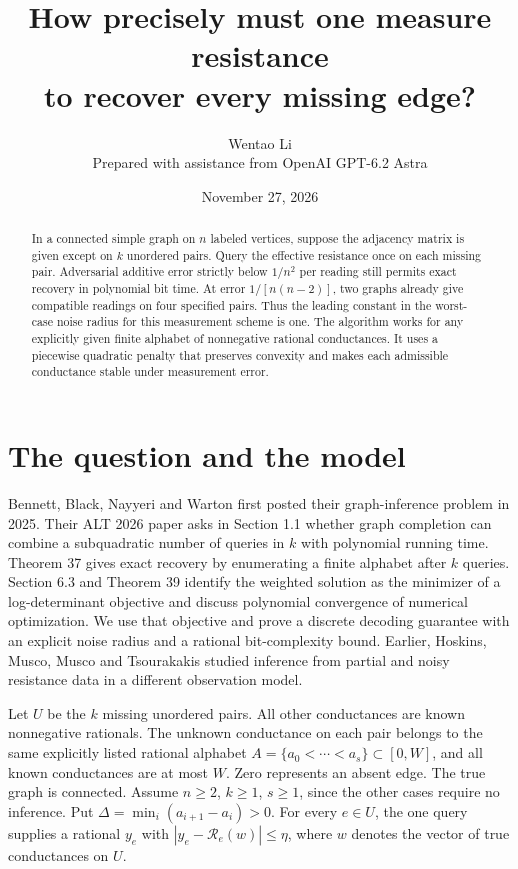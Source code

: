 \documentclass[11pt]{article}
\title{How precisely must one measure resistance\\ to recover every missing edge?}
\author{Wentao Li\\\small Prepared with assistance from OpenAI GPT-6.2 Astra}
\date{November 27, 2026}
\newcommand{\res}{\mathcal R}
\begin{document}
\maketitle
\begin{abstract}
In a connected simple graph on $n$ labeled vertices, suppose the adjacency matrix is given except on $k$ unordered pairs. Query the effective resistance once on each missing pair. Adversarial additive error strictly below $1/n^2$ per reading still permits exact recovery in polynomial bit time. At error $1/[n(n-2)]$, two graphs already give compatible readings on four specified pairs. Thus the leading constant in the worst-case noise radius for this measurement scheme is one. The algorithm works for any explicitly given finite alphabet of nonnegative rational conductances. It uses a piecewise quadratic penalty that preserves convexity and makes each admissible conductance stable under measurement error.
\end{abstract}

\section*{The question and the model}
Bennett, Black, Nayyeri and Warton first posted their graph-inference problem in 2025. Their ALT 2026 paper asks in Section 1.1 whether graph completion can combine a subquadratic number of queries in $k$ with polynomial running time. Theorem 37 gives exact recovery by enumerating a finite alphabet after $k$ queries. Section 6.3 and Theorem 39 identify the weighted solution as the minimizer of a log-determinant objective and discuss polynomial convergence of numerical optimization. We use that objective and prove a discrete decoding guarantee with an explicit noise radius and a rational bit-complexity bound. Earlier, Hoskins, Musco, Musco and Tsourakakis studied inference from partial and noisy resistance data in a different observation model.

Let $U$ be the $k$ missing unordered pairs. All other conductances are known nonnegative rationals. The unknown conductance on each pair belongs to the same explicitly listed rational alphabet $A=\{a_0<\cdots<a_s\}\subset[0,W]$, and all known conductances are at most $W$. Zero represents an absent edge. The true graph is connected. Assume $n\ge2$, $k\ge1$, $s\ge1$, since the other cases require no inference. Put $\Delta=\min_i(a_{i+1}-a_i)>0$. For every $e\in U$, the one query supplies a rational $y_e$ with $|y_e-\res_e(w)|\le\eta$, where $w$ denotes the vector of true conductances on $U$.
\end{document}
